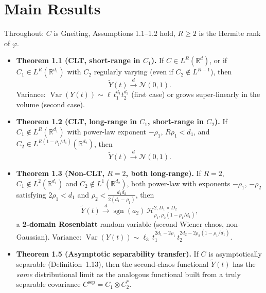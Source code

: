\documentclass[11pt,a4paper]{article}
\begin{document}
\section{Main Results}

Throughout: $C$ is Gneiting, Assumptions 1.1--1.2 hold, $R \ge 2$ is the Hermite rank of $\varphi$.

\begin{itemize}[leftmargin=*]

\item \textbf{Theorem 1.1 (CLT, short-range in $C_1$).}
If $C \in L^R(\mathbb{R}^d)$, or if $C_1 \in L^R(\mathbb{R}^{d_1})$ with $C_2$ regularly varying (even if $C_2 \notin L^{R-1}$), then
\[
\widetilde{Y}(t) \xrightarrow{d} \mathcal{N}(0,1).
\]
Variance: $\operatorname{Var}(Y(t)) \sim \ell\, t_1^{d_1} t_2^{d_2}$ (first case) or grows super-linearly in the volume (second case).

\item \textbf{Theorem 1.2 (CLT, long-range in $C_1$, short-range in $C_2$).}
If $C_1 \notin L^R(\mathbb{R}^{d_1})$ with power-law exponent $-\rho_1$, $R\rho_1 < d_1$, and $C_2 \in L^{R(1-\rho_1/d_1)}(\mathbb{R}^{d_2})$, then
\[
\widetilde{Y}(t) \xrightarrow{d} \mathcal{N}(0,1).
\]

\item \textbf{Theorem 1.3 (Non-CLT, $R=2$, both long-range).}
If $R=2$, $C_1 \notin L^2(\mathbb{R}^{d_1})$ and $C_2 \notin L^1(\mathbb{R}^{d_2})$, both power-law with exponents $-\rho_1$, $-\rho_2$ satisfying $2\rho_1 < d_1$ and $\rho_2 < \frac{d_1 d_2}{2(d_1 - \rho_1)}$, then
\[
\widetilde{Y}(t) \xrightarrow{d} \operatorname{sgn}(a_2)\,\mathcal{H}_{\rho_1,\rho_2(1-\rho_1/d_1)}^{2, D_1 \times D_2},
\]
a \textbf{2-domain Rosenblatt} random variable (second Wiener chaos, non-Gaussian).
Variance: $\operatorname{Var}(Y(t)) \sim \ell_3\, t_1^{2d_1 - 2\rho_1}\, t_2^{2d_2 - 2\rho_2(1-\rho_1/d_1)}$.

\item \textbf{Theorem 1.5 (Asymptotic separability transfer).}
If $C$ is asymptotically separable (Definition~1.13), then the second-chaos functional $\widetilde{Y}(t)$ has the \emph{same} distributional limit as the analogous functional built from a truly separable covariance $C^{\mathrm{sep}} = C_1 \otimes C_2^*$.

\end{itemize}
\end{document}
